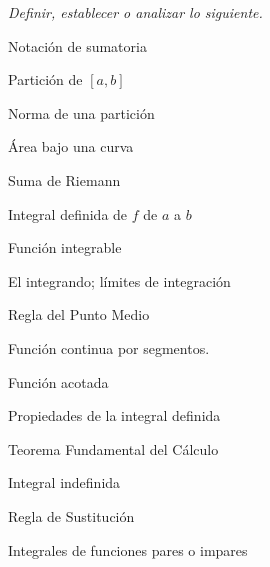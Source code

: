 
\noindent \textit{Definir, establecer o analizar lo siguiente.}
\begin{enumerate}
    \begin{minipage}{0.45\textwidth}
    \item Notación de sumatoria
    \item Partición de $[a, b]$
    \item Norma de una partición
    \item Área bajo una curva
    \item Suma de Riemann
    \item Integral definida de $f$ de $a$ a $b$
    \item Función integrable
    \item El integrando; límites de integración
    \end{minipage}%
    \begin{minipage}{0.45\textwidth}
    \setcounter{enumi}{8}
    \item Regla del Punto Medio
    \item Función continua por segmentos.
    \item Función acotada
    \item Propiedades de la integral definida
    \item Teorema Fundamental del Cálculo
    \item Integral indefinida
    \item Regla de Sustitución
    \item Integrales de funciones pares o impares
    \end{minipage}
\end{enumerate}
